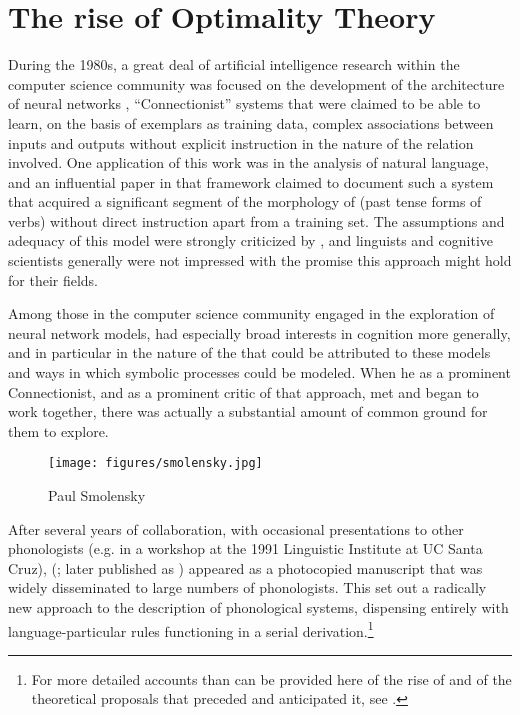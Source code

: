 \section{The rise of Optimality Theory}
\label{sec:rise-ot}
\largerpage
During the 1980s, a great deal of artificial intelligence research
within the computer science community was focused on the development
of the architecture of neural networks
\citep{rumelhart.mcclelland86:pdp}, ``Connectionist'' systems that
were claimed to be able to learn, on the basis of exemplars as
training data, complex associations between inputs and outputs without
explicit instruction in the nature of the relation involved. One
application of this work was in the analysis of natural language, and
an influential paper in that framework
\citep{rumelhart.mcclelland86:past} claimed to document such a system
that acquired a significant segment of the morphology of  (past
tense forms of verbs) without direct instruction apart from a training
set. The assumptions and adequacy of this model were strongly
criticized by \citet{pinker.prince88:connectionism}, and linguists and
cognitive scientists generally were not impressed with the promise
this approach might hold for their fields.

Among those in the computer science community engaged in the
exploration of neural network models,  had especially
broad interests in cognition more generally, and in particular in the
nature of the  that could be attributed to these models
and ways in which symbolic processes could be modeled. When he
as a prominent Connectionist, and  as a prominent critic of
that approach, met and began to work together, there was actually a
substantial amount of common ground for them to explore.

\begin{wrapfigure}[10]{r}{.4\textwidth}
  \texttt{[image: figures/smolensky.jpg]}
  \caption{Paul Smolensky}
  \label{fig:ch.otlabphon.smolensky}
\end{wrapfigure}
After several years of collaboration, with occasional presentations to
other phonologists (e.g. in a workshop at the 1991 Linguistic
Institute at UC Santa Cruz), \citeauthor{prince:smolensky:optimality}
(\citeyear{prince:smolensky:optimality}; later published as
\citealt{prince:smolensky04:ot}) appeared as a photocopied manuscript
that was widely disseminated to large numbers of phonologists. This
set out a radically new approach to the description of phonological
systems, dispensing entirely with language-particular rules
functioning in a serial derivation.\footnote{For more detailed
  accounts than can be provided here of the rise of 
  and of the theoretical proposals that preceded and anticipated it,
  see
  \protect\citealt{burzio_rise_1995,griffiths19:expansion-ot,vanOostendorp21:optimality}.}

